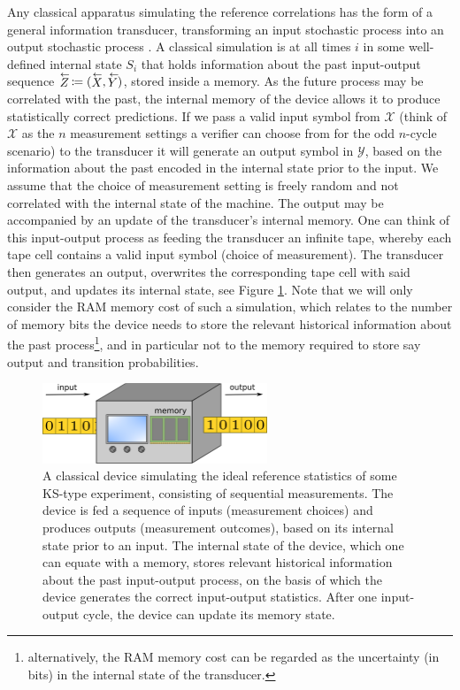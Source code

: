 Any classical apparatus simulating the reference correlations has the form of a general information transducer, transforming an input stochastic process into an output stochastic process \cite{Cabello2018}. A classical simulation is at all times $i$ in some well-defined internal state $S_i$ that holds information about the past input-output sequence $\oset{\leftarrow}{Z}\thinspace\coloneqq(\oset{\leftarrow}{X},\oset{\leftarrow}{Y})$, stored inside a memory. As the future process may be correlated with the past, the internal memory of the device allows it to produce statistically correct predictions. If we pass a valid input symbol from $\mathcal{X}$ (think of $\mathcal{X}$ as the $n$ measurement settings a verifier can choose from for the odd $n$-cycle scenario) to the transducer it will generate an output symbol in $\mathcal{Y}$, based on the information about the past encoded in the internal state prior to the input. We assume that the choice of measurement setting is freely random and not correlated with the internal state of the machine. The output may be accompanied by an update of the transducer's internal memory. One can think of this input-output process as feeding the transducer an infinite tape, whereby each tape cell contains a valid input symbol (choice of measurement). The transducer then generates an output, overwrites the corresponding tape cell with said output, and updates its internal state, see Figure \ref{fig:transducer}. Note that we will only consider the RAM memory cost of such a simulation, which relates to the number of memory bits the device needs to store the relevant historical information about the past process\footnote{alternatively, the RAM memory cost can be regarded as the uncertainty (in bits) in the internal state of the transducer.}, and in particular not to the memory required to store say output and transition probabilities.

\begin{figure}
    \centering
    \includegraphics[width=0.6\textwidth]{images/transducer.png}
    \caption{A classical device simulating the ideal reference statistics of some KS-type experiment, consisting of sequential measurements. The device is fed a sequence of inputs (measurement choices) and produces outputs (measurement outcomes), based on its internal state prior to an input. The internal state of the device, which one can equate with a memory, stores relevant historical information about the past input-output process, on the basis of which the device generates the correct input-output statistics. After one input-output cycle, the device can update its memory state.}
    \label{fig:transducer}
\end{figure}

